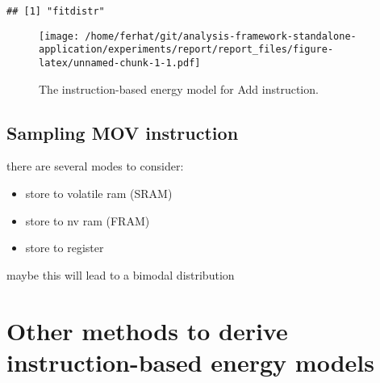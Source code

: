 \documentclass[]{article}
\newenvironment{Shaded}{\begin{snugshade}}{\end{snugshade}}
\newcommand{\CommentTok}[1]{\textcolor[rgb]{0.56,0.35,0.01}{\textit{#1}}}
\newcommand{\DataTypeTok}[1]{\textcolor[rgb]{0.13,0.29,0.53}{#1}}
\newcommand{\DecValTok}[1]{\textcolor[rgb]{0.00,0.00,0.81}{#1}}
\newcommand{\KeywordTok}[1]{\textcolor[rgb]{0.13,0.29,0.53}{\textbf{#1}}}
\newcommand{\NormalTok}[1]{#1}
\newcommand{\OperatorTok}[1]{\textcolor[rgb]{0.81,0.36,0.00}{\textbf{#1}}}
\newcommand{\OtherTok}[1]{\textcolor[rgb]{0.56,0.35,0.01}{#1}}
\newcommand{\StringTok}[1]{\textcolor[rgb]{0.31,0.60,0.02}{#1}}
\providecommand{\tightlist}{%
  \setlength{\itemsep}{0pt}\setlength{\parskip}{0pt}}
\begin{document}
\begin{verbatim}
## [1] "fitdistr"
\end{verbatim}

\begin{Shaded}
\end{Shaded}

\begin{figure}
\centering
\texttt{[image: /home/ferhat/git/analysis-framework-standalone-application/experiments/report/report\_files/figure-latex/unnamed-chunk-1-1.pdf]}
\caption{\label{fig:unnamed-chunk-1}The instruction-based energy model for Add instruction.}
\end{figure}

\hypertarget{sampling-mov-instruction}{%
\subsection{Sampling MOV instruction}\label{sampling-mov-instruction}}

there are several modes to consider:

\begin{itemize}
\tightlist
\item
  store to volatile ram (SRAM)
\item
  store to nv ram (FRAM)
\item
  store to register
\end{itemize}

maybe this will lead to a bimodal distribution

\hypertarget{other-methods-to-derive-instruction-based-energy-models}{%
\section{Other methods to derive instruction-based energy models}\label{other-methods-to-derive-instruction-based-energy-models}}
\end{document}

